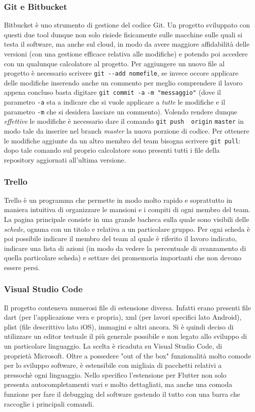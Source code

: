 	\subsubsection{Git e Bitbucket}
	Bitbucket è uno strumento di gestione del codice Git. Un
	progetto sviluppato con questi due tool dunque
	non solo risiede fisicamente sulle macchine sulle quali si testa il
	software, ma anche sul cloud, in modo da avere maggiore affidabilità delle
	versioni (con una gestione efficace relativa alle modifiche) e potendo poi
	accedere con un qualunque calcolatore al progetto. Per aggiungere un nuovo
	file al progetto è necessario scrivere               
	\verb|git --add nomefile|, se invece occore applicare delle modifiche
	inserendo anche un commento per meglio comprendere il lavoro appena concluso
	basta digitare \verb|git commit -a| \verb|-m "messaggio"| (dove il parametro
	\verb|-a| sta a indicare che si vuole applicare a \textit{tutte} le
	modifiche e il parametro \verb|-m| che si desidera lasciare un commento).
	Volendo rendere dunque \textit{effettive} le modifiche è necessario dare
	il comando \verb|git push  origin| \verb|master| in modo tale da inserire nel branch
	\textit{master} la nuova porzione di codice. Per ottenere le modifiche
	aggiunte da un altro membro del team bisogna scrivere \verb|git pull|:
	dopo tale comando sul proprio calcolatore sono presenti tutti i file della
	repository aggiornati all'ultima versione.

	\subsubsection{Trello}
	Trello è un programma che permette in modo molto rapido e soprattutto in
	maniera intuitiva di organizzare le mansioni e i compiti di ogni membro del
	team. La pagina principale consiste in una grande bacheca sulla quale sono
	visibili delle \textit{schede}, ognuna con un titolo e relativa a un
	particolare gruppo. Per ogni scheda è poi possibile indicare il membro del
	team al quale è riferito il lavoro indicato, indicare una lista di azioni
	(in modo da vedere la percentuale di avanzamento di quella particolare
	scheda) e settare dei promemoria importanti che non devono essere persi.

	\subsubsection{Visual Studio Code}
	Il progetto conteneva numerosi file di estensione diversa. Infatti erano
	presenti file dart (per l'applicazione vera e propria), xml (per lavori
	specifici lato Android), plist (file descrittivo lato iOS), immagini e altri
	ancora. Si è quindi deciso di utilizzare un editor testuale il più generale
	possibile e non legato allo sviluppo di un particolare linguaggio. La
	scelta è ricaduta su Visual Studio Code, di proprietà Microsoft. Oltre a
	possedere "out of the box" funzionalità molto comode per lo sviluppo
	software, è estensibile con migliaia di pacchetti relativi a pressochè ogni
	linguaggio. Nello specifico l'estensione per Flutter non solo presenta
	autocompletamenti vari e molto dettagliati, ma anche una comoda funzione per
	fare il debugging del software gestendo il tutto con una barra che raccoglie i
	principali comandi. 

